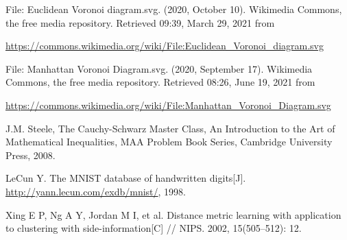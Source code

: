 \documentclass{article}
\begin{document}
\begin{thebibliography}{1}

File: Euclidean Voronoi diagram.svg. (2020, October 10). Wikimedia Commons, the free media repository. Retrieved 09:39, March 29, 2021 from 

\url{https://commons.wikimedia.org/wiki/File:Euclidean_Voronoi_diagram.svg}


File: Manhattan Voronoi Diagram.svg. (2020, September 17). Wikimedia Commons, the free media repository. Retrieved 08:26, June 19, 2021 from

\url{https://commons.wikimedia.org/wiki/File:Manhattan_Voronoi_Diagram.svg}

J.M. Steele, The Cauchy-Schwarz Master Class, An Introduction to the Art of Mathematical Inequalities, MAA Problem Book Series,
Cambridge University Press, 2008.

LeCun Y. The MNIST database of handwritten digits[J]. \url{http://yann.lecun.com/exdb/mnist/}, 1998.

Xing E P, Ng A Y, Jordan M I, et al. Distance metric learning with application to clustering with side-information[C] // NIPS. 2002, 15(505–512): 12.

\end{thebibliography}
\end{document}
